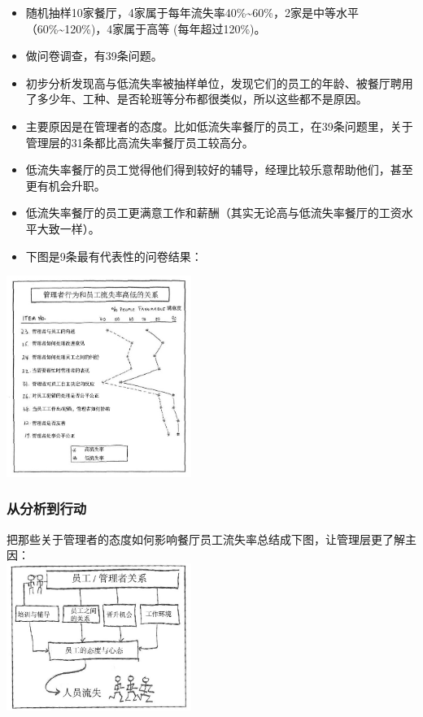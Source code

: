 \begin{itemize}
\tightlist
\item
  随机抽样10家餐厅，4家属于每年流失率40\%\textasciitilde{}60\%，2家是中等水平（60\%\textasciitilde{}120\%)，4家属于高等
  (每年超过120\%)。
\item
  做问卷调查，有39条问题。
\item
  初步分析发现高与低流失率被抽样单位，发现它们的员工的年龄、被餐厅聘用了多少年、工种、是否轮班等分布都很类似，所以这些都不是原因。
\item
  主要原因是在管理者的态度。比如低流失率餐厅的员工，在39条问题里，关于管理层的31条都比高流失率餐厅员工较高分。
\item
  低流失率餐厅的员工觉得他们得到较好的辅导，经理比较乐意帮助他们，甚至更有机会升职。
\item
  低流失率餐厅的员工更满意工作和薪酬（其实无论高与低流失率餐厅的工资水平大致一样）。
\item
  下图是9条最有代表性的问卷结果：
\end{itemize}


\includegraphics[width=6cm]{WeisbordP2182.jpg}

\hypertarget{ux4eceux5206ux6790ux5230ux884cux52a8}{%
\subsubsection{从分析到行动}\label{ux4eceux5206ux6790ux5230ux884cux52a8}}

把那些关于管理者的态度如何影响餐厅员工流失率总结成下图，让管理层更了解主因：\\

\includegraphics[width=6cm]{WeisbordP2191.jpg}


